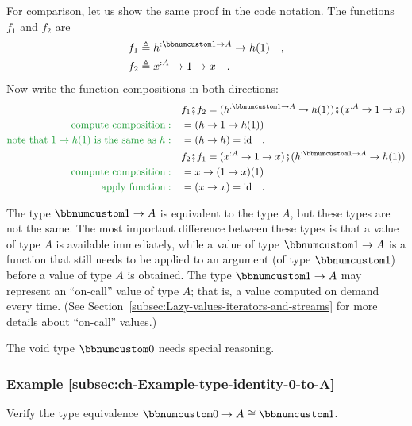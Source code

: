 For comparison, let us show the same proof in the code notation. The
functions $f_{1}$ and $f_{2}$ are 
\begin{align*}
 & f_{1}\triangleq h^{:\bbnum 1\rightarrow A}\rightarrow h(1)\quad,\\
 & f_{2}\triangleq x^{:A}\rightarrow1\rightarrow x\quad.
\end{align*}
Now write the function compositions in both directions:
\begin{align*}
 & f_{1}\bef f_{2}=(h^{:\bbnum 1\rightarrow A}\rightarrow h(1))\bef(x^{:A}\rightarrow1\rightarrow x)\\
{\color{greenunder}\text{compute composition}:}\quad & =\left(h\rightarrow1\rightarrow h(1)\right)\\
{\color{greenunder}\text{note that }1\rightarrow h(1)\text{ is the same as }h:}\quad & =\left(h\rightarrow h\right)=\text{id}\quad.\\
 & f_{2}\bef f_{1}=(x^{:A}\rightarrow1\rightarrow x)\bef(h^{:\bbnum 1\rightarrow A}\rightarrow h(1))\\
{\color{greenunder}\text{compute composition}:}\quad & =x\rightarrow(1\rightarrow x)(1)\\
{\color{greenunder}\text{apply function}:}\quad & =\left(x\rightarrow x\right)=\text{id}\quad.
\end{align*}

The type $\bbnum 1\rightarrow A$ is equivalent to the type $A$,
but these types are not the same. The most important difference between
these types is that a value of type $A$ is available immediately,
while a value of type $\bbnum 1\rightarrow A$ is a function that
still needs to be applied to an argument (of type $\bbnum 1$) before
a value of type $A$ is obtained. The type $\bbnum 1\rightarrow A$
may represent an ``on-call'' value of type
$A$; that is, a value computed on demand every time. (See Section~\ref{subsec:Lazy-values-iterators-and-streams}
for more details about ``on-call'' values.)

The void type $\bbnum 0$ needs special reasoning. 

\subsubsection{Example \label{subsec:ch-Example-type-identity-0-to-A}\ref{subsec:ch-Example-type-identity-0-to-A}}

Verify the type equivalence $\bbnum 0\rightarrow A\cong\bbnum 1$.

